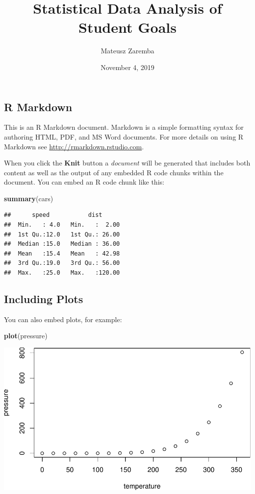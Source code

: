 \documentclass[]{article}
\title{Statistical Data Analysis of Student Goals}
\author{Mateusz Zaremba}
\date{November 4, 2019}
\newenvironment{Shaded}{\begin{snugshade}}{\end{snugshade}}
\newcommand{\KeywordTok}[1]{\textcolor[rgb]{0.13,0.29,0.53}{\textbf{#1}}}
\newcommand{\NormalTok}[1]{#1}
\begin{document}
\maketitle

{
\setcounter{tocdepth}{2}
\tableofcontents
}
\hypertarget{r-markdown}{%
\subsection{R Markdown}\label{r-markdown}}

This is an R Markdown document. Markdown is a simple formatting syntax
for authoring HTML, PDF, and MS Word documents. For more details on
using R Markdown see \url{http://rmarkdown.rstudio.com}.

When you click the \textbf{Knit} button a \emph{document} will be
generated that includes both content as well as the output of any
embedded R code chunks within the document. You can embed an R code
chunk like this:

\begin{Shaded}
\begin{Highlighting}[]
\KeywordTok{summary}\NormalTok{(cars)}
\end{Highlighting}
\end{Shaded}

\begin{verbatim}
##      speed           dist       
##  Min.   : 4.0   Min.   :  2.00  
##  1st Qu.:12.0   1st Qu.: 26.00  
##  Median :15.0   Median : 36.00  
##  Mean   :15.4   Mean   : 42.98  
##  3rd Qu.:19.0   3rd Qu.: 56.00  
##  Max.   :25.0   Max.   :120.00
\end{verbatim}

\hypertarget{including-plots}{%
\subsection{Including Plots}\label{including-plots}}

You can also embed plots, for example:

\begin{Shaded}
\begin{Highlighting}[]
\KeywordTok{plot}\NormalTok{(pressure)}
\end{Highlighting}
\end{Shaded}

\includegraphics{StudentGoals_files/figure-latex/pressure-1.pdf}
\end{document}
